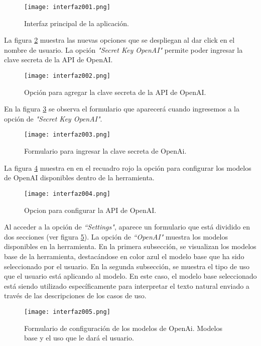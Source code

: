\begin{figure}[H]  
	\centering
	\texttt{[image: interfaz001.png]}
	\caption{Interfaz principal de la aplicación.}
	\label{fig:cap3_interfaz_001}
\end{figure}

La figura \ref{fig:cap3_interfaz_002} muestra las nuevas opciones que se despliegan al dar click en el nombre de usuario. La opción \textit{"Secret Key OpenAI"} permite poder ingresar la clave secreta de la API de OpenAI.

\begin{figure}[H]  
	\centering
	\texttt{[image: interfaz002.png]} 
	\caption{Opción para agregar la clave secreta de la API de OpenAI.}
	\label{fig:cap3_interfaz_002}
\end{figure}

En la figura \ref{fig:cap3_interfaz_003} se observa el formulario que aparecerá cuando ingresemos a la opción de \textit{"Secret Key OpenAI"}.

\begin{figure}[H]  
	\centering
	\texttt{[image: interfaz003.png]} 
	\caption{Formulario para ingresar la clave secreta de OpenAi.}
	\label{fig:cap3_interfaz_003}
\end{figure}

La figura \ref{fig:cap3_interfaz_004} muestra en en el recuadro rojo la opción para configurar los modelos de OpenAI disponibles dentro de la herramienta.
 
\begin{figure}[H]  
	\centering
	\texttt{[image: interfaz004.png]} 
	\caption{Opcion para configurar la API de OpenAI.}
	\label{fig:cap3_interfaz_004}
\end{figure}

Al acceder a la opción de \textit{``Settings"}, aparece un formulario que está dividido en dos secciones (ver figura \ref{fig:cap3_interfaz_005}). La opción de \textit{``OpenAI"} muestra los modelos disponibles en la herramienta. En la primera subsección, se visualizan los modelos base de la herramienta, destacándose en color azul el modelo base que ha sido seleccionado por el usuario. En la segunda subsección, se muestra el tipo de uso que el usuario está aplicando al modelo. En este caso, el modelo base seleccionado está siendo utilizado específicamente para interpretar el texto natural enviado a través de las descripciones de los casos de uso.

\begin{figure}[H]  
	\centering
	\texttt{[image: interfaz005.png]} 
	\caption{Formulario de configuración de los modelos de OpenAi. Modelos base y el uso que le dará el usuario.}
	\label{fig:cap3_interfaz_005}
\end{figure}

